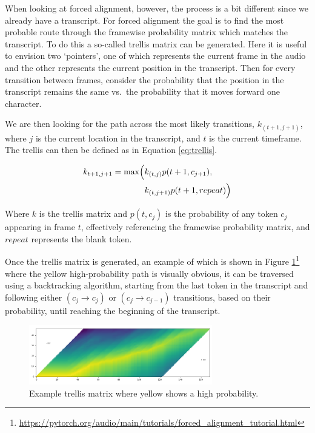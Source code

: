 \documentclass[twocolumn]{article}
\begin{document}
When looking at forced alignment, however, the process is a bit
different since we already have a transcript. For forced alignment the
goal is to find the most probable route through the framewise
probability matrix which matches the transcript. To do this a so-called
trellis matrix can be generated. Here it is useful to envision two
`pointers', one of which represents the current frame in the audio and
the other represents the current position in the transcript. Then for
every transition between frames, consider the probability that the
position in the transcript remains the same vs.~the probability that it
moves forward one character.

We are then looking for the path across the most likely transitions,
\(k_{(t+1, j+1)}\), where \(j\) is the current location in the
transcript, and \(t\) is the current timeframe. The trellis can then be
defined as in Equation \ref{eq:trellis}.

\begin{align}
\label{eq:trellis}
k_{t+1, j+1} = \max \Bigl( & k_{(t,j)}p(t+1, c_{j+1}), \\
& k_{(t,j+1)}p(t+1, repeat) \Bigr) \nonumber
\end{align}

Where \(k\) is the trellis matrix and \(p(t, c_j)\) is the probability
of any token \(c_j\) appearing in frame \(t\), effectively referencing
the framewise probability matrix, and \(repeat\) represents the blank
token.

Once the trellis matrix is generated, an example of which is shown in
Figure \ref{fig:trellis-matrix}\footnote{\url{https://pytorch.org/audio/main/tutorials/forced\_alignment\_tutorial.html}}
where the yellow high-probability path is visually obvious, it can be
traversed using a backtracking algorithm, starting from the last token
in the transcript and following either \((c_j \rightarrow c_j)\) or
\((c_j \rightarrow c_{j-1})\) transitions, based on their probability,
until reaching the beginning of the transcript.

\begin{figure}[h]
\centering
\includegraphics[width=8cm]{trellis-matrix}
\caption{Example trellis matrix where yellow shows a high probability. \label{fig:trellis-matrix}}
\end{figure}
\end{document}
